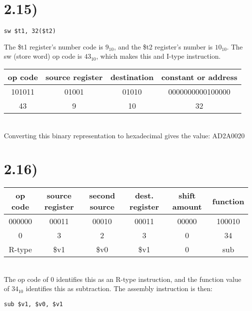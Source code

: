 \documentclass[a4paper,11pt]{article}
\begin{document}

\section*{2.15)} 

\begin{verbatim}
sw $t1, 32($t2)
\end{verbatim}

\noindent The \$t1 register's number code is $9_{10}$, and the \$t2 register's number is $10_{10}$.  The sw (store word) op code is $43_{10}$, which makes this and I-type instruction.
\\

\noindent
\begin{tabular}{| c | c | c | c |}
  \hline	
  op code & source register & destination & constant or address\\  \hline  		
  101011 & 01001 & 01010 & 0000000000100000 \\ \hline
  43 & 9 & 10 & 32  \\ \hline
\end{tabular} \\

\noindent Converting this binary representation to hexadecimal gives the value: AD2A0020


\section*{2.16)} 

\begin{tabular}{| c | c | c | c | c | c |}
  \hline	
  op code & source register & second source & dest. register & shift amount & function \\  \hline  		
  000000 & 00011 & 00010 & 00011 & 00000 & 100010  \\ \hline
  0 & 3 & 2 & 3 & 0 & 34 \\ \hline
  R-type & \$v1 & \$v0 & \$v1 & 0 & sub \\\hline
\end{tabular} \\

\noindent The op code of 0 identifies this as an R-type instruction, and the function value of $34_{10}$ identifies this as subtraction.  The assembly instruction is then:

\begin{verbatim}
sub $v1, $v0, $v1
\end{verbatim}
\end{document}
